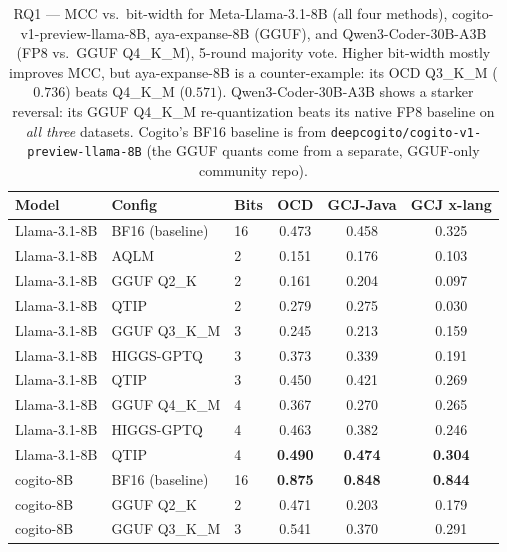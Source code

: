 \documentclass[11pt]{article}
\newcommand{\best}[1]{\textbf{#1}}
\begin{document}
\begin{table}[htbp]
  \centering
  \caption{RQ1 --- MCC vs.\ bit-width for Meta-Llama-3.1-8B (all four methods),
           cogito-v1-preview-llama-8B, aya-expanse-8B (GGUF), and
           Qwen3-Coder-30B-A3B (FP8 vs.\ GGUF Q4\_K\_M), 5-round
           majority vote. Higher bit-width mostly improves MCC, but
           aya-expanse-8B is a counter-example: its OCD Q3\_K\_M ($0.736$)
           beats Q4\_K\_M ($0.571$). Qwen3-Coder-30B-A3B shows a starker
           reversal: its GGUF Q4\_K\_M re-quantization beats its native FP8
           baseline on \emph{all three} datasets. Cogito's BF16 baseline is
           from \texttt{deepcogito/cogito-v1-preview-llama-8B} (the GGUF
           quants come from a separate, GGUF-only community repo).}
  \label{tab:rq1}
  \small
  \begin{tabular}{lllccc}
    \toprule
    \textbf{Model} & \textbf{Config} & \textbf{Bits} & \textbf{OCD} & \textbf{GCJ-Java} & \textbf{GCJ x-lang} \\
    \midrule
    Llama-3.1-8B & BF16 (baseline)      & 16 & 0.473 & 0.458 & 0.325 \\
    \midrule
    Llama-3.1-8B & AQLM                 & 2  & 0.151 & 0.176 & 0.103 \\
    Llama-3.1-8B & GGUF Q2\_K           & 2  & 0.161 & 0.204 & 0.097 \\
    Llama-3.1-8B & QTIP                 & 2  & 0.279 & 0.275 & 0.030 \\
    \midrule
    Llama-3.1-8B & GGUF Q3\_K\_M        & 3  & 0.245 & 0.213 & 0.159 \\
    Llama-3.1-8B & HIGGS-GPTQ           & 3  & 0.373 & 0.339 & 0.191 \\
    Llama-3.1-8B & QTIP                 & 3  & 0.450 & 0.421 & 0.269 \\
    \midrule
    Llama-3.1-8B & GGUF Q4\_K\_M        & 4  & 0.367 & 0.270 & 0.265 \\
    Llama-3.1-8B & HIGGS-GPTQ           & 4  & 0.463 & 0.382 & 0.246 \\
    Llama-3.1-8B & QTIP                 & 4  & \best{0.490} & \best{0.474} & \best{0.304} \\
    \midrule
    cogito-8B    & BF16 (baseline)      & 16 & \best{0.875} & \best{0.848} & \best{0.844} \\
    \midrule
    cogito-8B    & GGUF Q2\_K           & 2  & 0.471 & 0.203 & 0.179 \\
    cogito-8B    & GGUF Q3\_K\_M        & 3  & 0.541 & 0.370 & 0.291 \\

\end{tabular}
\end{table}
\end{document}

